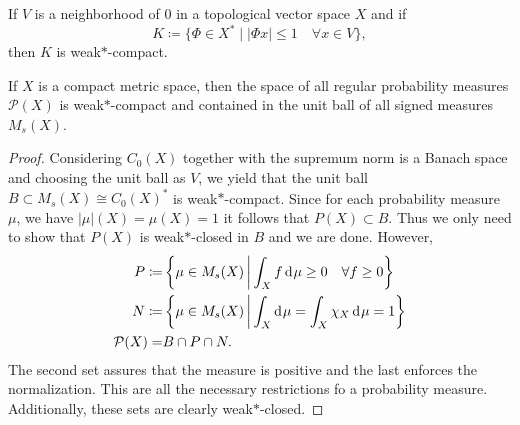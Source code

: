 \begin{thm}
  If \(V\) is a neighborhood of 0 in a topological vector space \(X\) and if
  \[
    K \coloneqq \{ \Phi \in X^\ast \mid |\Phi x| \leq 1 \quad \forall x \in V\},
  \]
  then \(K\) is weak\(\ast\)-compact.
\end{thm}

\begin{cor}
  \label{cor:banach-alaoglu}
  If \(X\) is a compact metric space, then the space of all regular probability measures \(\mathcal{P}(X)\) is weak\(\ast\)-compact and contained in the unit ball of all signed measures \(M_{s}(X)\).
\end{cor}

\begin{proof}
  Considering \(C_0(X)\) together with the supremum norm is a Banach space and choosing the unit ball as \(V\), we yield that the unit ball \(B \subset M_s(X) \cong C_0(X)^\ast\) is weak\(\ast\)-compact. Since for each probability measure \(\mu\), we have \(|\mu|(X) = \mu(X) = 1\) it follows that \(P(X) \subset B\). Thus we only need to show that \(P(X)\) is weak\(\ast\)-closed in \(B\) and we are done. However,
  \begin{align*}
    P \coloneqq & \left\{\mu \in M_s(X) \relmid \int_X f \d\mu \geq 0 \quad \forall f \geq 0\right\}\\
    N \coloneqq & \left\{\mu \in M_s(X) \relmid \int_X \d\mu = \int_X \chi_X \d\mu = 1\right\}\\
    \mathcal{P}(X)  = & B \cap P \cap N.
  \end{align*}
  The second set assures that the measure is positive and the last enforces the normalization. This are all the necessary restrictions fo a probability measure. Additionally, these sets are clearly weak\(\ast\)-closed.
\end{proof}

